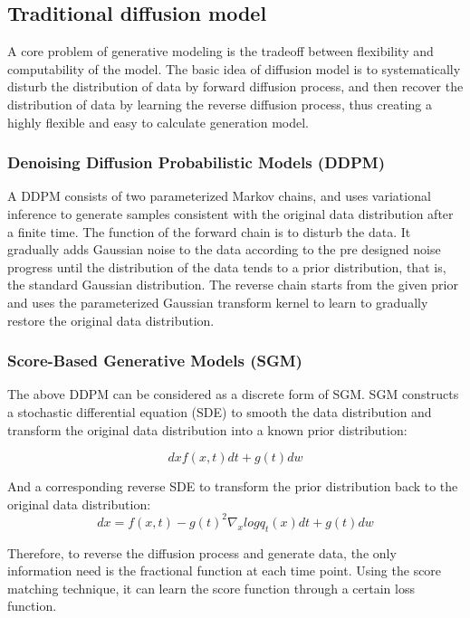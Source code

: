 \documentclass[conference]{IEEEtran}
\begin{document}
\subsection{Traditional diffusion model}
A core problem of generative modeling is the tradeoff between flexibility and computability of the model. The basic idea of diffusion model is to systematically disturb the distribution of data by forward diffusion process, and then recover the distribution of data by learning the reverse diffusion process, thus creating a highly flexible and easy to calculate generation model.

\subsubsection{Denoising Diffusion Probabilistic Models (DDPM) }\quad

A DDPM consists of two parameterized Markov chains, and uses variational inference to generate samples consistent with the original data distribution after a finite time. The function of the forward chain is to disturb the data. It gradually adds Gaussian noise to the data according to the pre designed noise progress until the distribution of the data tends to a prior distribution, that is, the standard Gaussian distribution. The reverse chain starts from the given prior and uses the parameterized Gaussian transform kernel to learn to gradually restore the original data distribution.

\subsubsection{Score-Based Generative Models (SGM) }\quad

The above DDPM can be considered as a discrete form of SGM. SGM constructs a stochastic differential equation (SDE) to smooth the data distribution and transform the original data distribution into a known prior distribution:

\begin{equation}
    dxf(x,t)dt+g(t)dw
\end{equation}

And a corresponding reverse SDE to transform the prior distribution back to the original data distribution:
\begin{equation}
    dx=f(x,t)-g(t)^2\nabla_x logq_t(x)dt+g(t)dw
\end{equation}

Therefore, to reverse the diffusion process and generate data, the only information need is the fractional function at each time point. Using the score matching technique, it can learn the score function through a certain loss function. 
\end{document}
